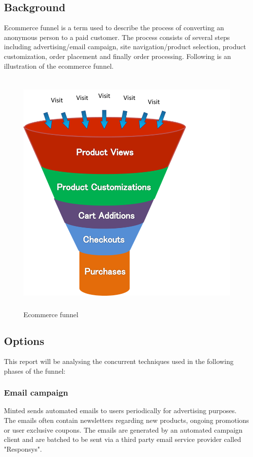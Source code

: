 \documentclass[12pt]{article}
\begin{document}
\subsection{Background}
Ecommerce funnel is a term used to describe the process of converting an anonymous person to a paid customer. The process consists of several steps including advertising/email campaign, site navigation/product selection, product customization, order placement and finally order processing. Following is an illustration of the ecommerce funnel.\\
\begin{figure}[ht!]
\centering
\includegraphics[width=12.5cm,height=12.5cm,keepaspectratio]{img/funnel.png}
\caption{Ecommerce funnel}
\label{overflow}
\end{figure}


\subsection{Options}
This report will be analysing the concurrent techniques used in the following phases of the funnel:
\subsubsection{Email campaign}
Minted sends automated emails to users periodically for advertising purposes. The emails often contain newsletters regarding new products, ongoing promotions or user exclusive coupons. The emails are generated by an automated campaign client and are batched to be sent via a third party email service provider called "Responsys".\\
		
\end{document}
